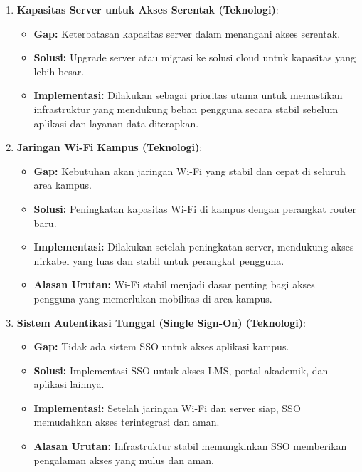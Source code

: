 \begin{enumerate}
	\item \textbf{Kapasitas Server untuk Akses Serentak (Teknologi)}:
	\begin{itemize}
		\item \textbf{Gap:} Keterbatasan kapasitas server dalam menangani akses serentak.
		\item \textbf{Solusi:} Upgrade server atau migrasi ke solusi cloud untuk kapasitas yang lebih besar.
		\item \textbf{Implementasi:} Dilakukan sebagai prioritas utama untuk memastikan infrastruktur yang mendukung beban pengguna secara stabil sebelum aplikasi dan layanan data diterapkan.
	\end{itemize}
	
	\item \textbf{Jaringan Wi-Fi Kampus (Teknologi)}:
	\begin{itemize}
		\item \textbf{Gap:} Kebutuhan akan jaringan Wi-Fi yang stabil dan cepat di seluruh area kampus.
		\item \textbf{Solusi:} Peningkatan kapasitas Wi-Fi di kampus dengan perangkat router baru.
		\item \textbf{Implementasi:} Dilakukan setelah peningkatan server, mendukung akses nirkabel yang luas dan stabil untuk perangkat pengguna.
		\item \textbf{Alasan Urutan:} Wi-Fi stabil menjadi dasar penting bagi akses pengguna yang memerlukan mobilitas di area kampus.
	\end{itemize}
	
	\item \textbf{Sistem Autentikasi Tunggal (Single Sign-On) (Teknologi)}:
	\begin{itemize}
		\item \textbf{Gap:} Tidak ada sistem SSO untuk akses aplikasi kampus.
		\item \textbf{Solusi:} Implementasi SSO untuk akses LMS, portal akademik, dan aplikasi lainnya.
		\item \textbf{Implementasi:} Setelah jaringan Wi-Fi dan server siap, SSO memudahkan akses terintegrasi dan aman.
		\item \textbf{Alasan Urutan:} Infrastruktur stabil memungkinkan SSO memberikan pengalaman akses yang mulus dan aman.
	\end{itemize}
	

\end{enumerate}
